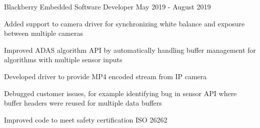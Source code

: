 

\begin{cventries}

  \cventry
    {Blackberry} %
    {Embedded Software Developer} %
    {May 2019 - August 2019} %
    {}
    {
      \begin{cvitems} %
        \item {Added support to camera driver for synchronizing white balance and exposure between multiple cameras}
        \item {Improved ADAS algorithm API by automatically handling buffer management for algorithms with multiple sensor inputs}
        \item {Developed driver to provide MP4 encoded stream from IP camera}
        \item {Debugged customer issues, for example identifying bug in sensor API where buffer headers were reused for multiple data buffers}
        \item {Improved code to meet safety certification ISO 26262}
      \end{cvitems}
    }


\end{cventries}
